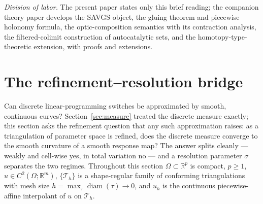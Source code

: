 \documentclass[11pt,a4paper]{article}
\theoremstyle{plain}
\theoremstyle{definition}
\theoremstyle{remark}
\newcommand{\RR}{\mathbb{R}}
\begin{document}
\emph{Division of labor.} The present paper states only this brief
reading; the companion theory paper develops the SAVGS object, the
gluing theorem and piecewise holonomy formula, the
optic-composition semantics with its contraction analysis, the
filtered-colimit construction of autocatalytic sets, and the
homotopy-type-theoretic extension, with proofs and extensions.

\section{The refinement--resolution bridge}
\label{sec:theoremB}

Can discrete linear-programming switches be approximated by smooth,
continuous curves? Section~\ref{sec:measure}
treated the discrete measure exactly; this section asks the
refinement question that any such approximation raises: as a triangulation of parameter space is refined,
does the discrete measure converge to the smooth curvature of a smooth
response map? The answer splits cleanly --- weakly and cell-wise yes,
in total variation no --- and a resolution parameter $\sigma$ separates
the two regimes. Throughout this section $\Omega \subset \RR^p$ is compact, $p \ge 1$,
$u \in C^2(\Omega; \RR^m)$, $\{\mathcal{T}_h\}$ is a shape-regular family
of conforming triangulations with mesh size
$h = \max_\tau \operatorname{diam}(\tau) \to 0$, and $u_h$ is the
continuous piecewise-affine interpolant of $u$ on $\mathcal{T}_h$.
\end{document}

